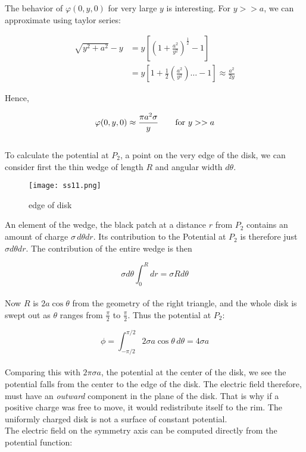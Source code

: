 \documentclass[svgnames]{article}
\begin{document}
The behavior of $\varphi (0, y, 0)$ for very large $y$ is interesting. For
$ y >> a$, we can approximate using taylor series:

\begin{align*} \sqrt{y^2 + a^2} - y &= y \left[\left(1+\frac{a^2}{y^2}\right)^\frac{1}{2} - 1 \right] \\
&= y \left[1 + \frac{1}{2} \left(\frac{a^2}{y^2}\right) \dots - 1 \right] \approx \frac{a^2}{2y} 
\end{align*}

Hence, 

\[ \varphi(0, y, 0) \approx \frac{\pi a^2 \sigma}{y} \hspace{20px} \text{for $y >> a$} \] \\ 

To calculate the potential at $P_2$, a point on the very edge of the disk, we
can consider first the thin wedge of length $R$ and angular width $d\theta$. 

\begin{figure}
  \centering
  \texttt{[image: ss11.png]}
  \caption{edge of disk}
\end{figure}

An element of the wedge, the black patch at a distance $r$ from $P_2$ contains
an amount of charge $\sigma \, d\theta dr$. Its contribution to the Potential
at $P_2$ is therefore just $\sigma d\theta dr$. The contribution of the entire
wedge is then

\[ \sigma d\theta \int_0^R dr = \sigma R d\theta \]\\

Now $R$ is $2a\cos\theta$ from the geometry of the right triangle, and the
whole disk is swept out as $\theta$ ranges from $\frac{\pi}{2}$ to
$\frac{\pi}{2}$. Thus the potential at $P_2$:

\[ \phi = \int_{-\pi / 2}^{\pi / 2} 2\sigma a \cos \theta \, d\theta = 4\sigma a \] \\

Comparing this with $2\pi \sigma a$, the potential at the center of the disk,
we see the potential falls from the center to the edge of the disk. The
electric field therefore, must have an \textit{outward} component in the plane
of the disk. That is why if a positive charge was free to move, it would
redistribute itself to the rim. The uniformly charged disk is not a surface of
constant potential. \\

The electric field on the symmetry axis can be computed directly from the potential function: 
\end{document}
